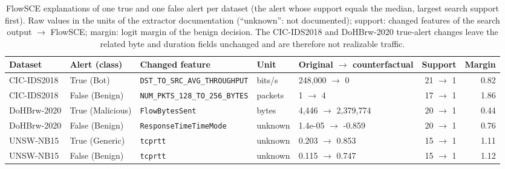 \begin{table}[t]
\centering\footnotesize
\caption{FlowSCE explanations of one true and one false alert per dataset (the alert whose support equals the median, largest search support first). Raw values in the units of the extractor documentation (``unknown'': not documented); support: changed features of the search output $\to$ FlowSCE; margin: logit margin of the benign decision. The CIC-IDS2018 and DoHBrw-2020 true-alert changes leave the related byte and duration fields unchanged and are therefore not realizable traffic.}
\label{tab:cases}
\begin{tabular}{@{}lllllrr@{}}
\toprule
Dataset & Alert (class) & Changed feature & Unit & Original $\to$ counterfactual & Support & Margin \\
\midrule
CIC-IDS2018 & True (Bot) & \texttt{DST\_TO\_SRC\_AVG\_THROUGHPUT} & bits/s & 248,000 $\to$ 0 & 21 $\to$ 1 & 0.82 \\
CIC-IDS2018 & False (Benign) & \texttt{NUM\_PKTS\_128\_TO\_256\_BYTES} & packets & 1 $\to$ 4 & 17 $\to$ 1 & 1.86 \\
DoHBrw-2020 & True (Malicious) & \texttt{FlowBytesSent} & bytes & 4,446 $\to$ 2,379,774 & 20 $\to$ 1 & 0.44 \\
DoHBrw-2020 & False (Benign) & \texttt{ResponseTimeTimeMode} & unknown & 1.4e-05 $\to$ -0.859 & 20 $\to$ 1 & 0.76 \\
UNSW-NB15 & True (Generic) & \texttt{tcprtt} & unknown & 0.203 $\to$ 0.853 & 15 $\to$ 1 & 1.11 \\
UNSW-NB15 & False (Benign) & \texttt{tcprtt} & unknown & 0.115 $\to$ 0.747 & 15 $\to$ 1 & 1.12 \\
\bottomrule
\end{tabular}
\end{table}
